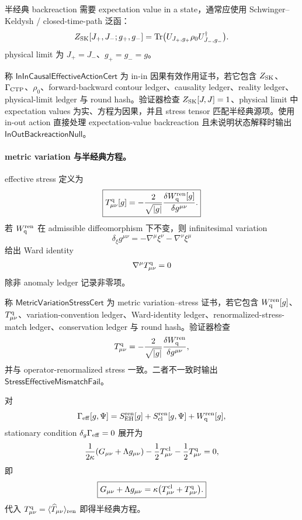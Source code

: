 半经典 backreaction 需要 expectation value in a state，通常应使用 Schwinger--Keldysh / closed-time-path 泛函：
\[
Z_{\rm SK}[J_+,J_-;g_+,g_-]
=
\operatorname{Tr}
\bigl(
U_{J_+,g_+}\rho_0U_{J_-,g_-}^{\dagger}
\bigr).
\]
physical limit 为 \(J_+=J_-\)、\(g_+=g_-=g\)。

\begin{definition}[in-in 因果有效作用证书]\label{def:typed-address-biaxial-completion-in-in-causal-effective-action-cert}
称 \(\mathsf{InInCausalEffectiveActionCert}\) 为 in-in 因果有效作用证书，若它包含 \(Z_{\rm SK}\)、\(\Gamma_{\rm CTP}\)、\(\rho_0\)、forward-backward contour ledger、causality ledger、reality ledger、physical-limit ledger 与 round hash。验证器检查 \(Z_{\rm SK}[J,J]=1\)、physical limit 中 expectation values 为实、方程为因果，并且 stress tensor 匹配半经典源项。使用 in-out action 直接处理 expectation-value backreaction 且未说明状态解释时输出 \(\mathsf{InOutBackreactionNull}\)。
\end{definition}

\paragraph{metric variation 与半经典方程。}
effective stress 定义为
\[
\boxed{
T^{\rm q}_{\mu\nu}[g]
=
-\frac{2}{\sqrt{|g|}}
\frac{\delta W_{\rm q}^{\rm ren}[g]}{\delta g^{\mu\nu}}.
}
\]
若 \(W_{\rm q}^{\rm ren}\) 在 admissible diffeomorphism 下不变，则 infinitesimal variation
\[
\delta_\xi g^{\mu\nu}
=
-\nabla^\mu\xi^\nu-\nabla^\nu\xi^\mu
\]
给出 Ward identity
\[
\nabla^\mu T^{\rm q}_{\mu\nu}=0
\]
除非 anomaly ledger 记录非零项。

\begin{definition}\label{def:typed-address-biaxial-completion-metric-variation-stress-cert}
称 \(\mathsf{MetricVariationStressCert}\) 为 metric variation--stress 证书，若它包含 \(W_{\rm q}^{\rm ren}[g]\)、\(T^{\rm q}_{\mu\nu}\)、variation-convention ledger、Ward-identity ledger、renormalized-stress-match ledger、conservation ledger 与 round hash。验证器检查
\[
T^{\rm q}_{\mu\nu}
=
-\frac{2}{\sqrt{|g|}}
\frac{\delta W_{\rm q}^{\rm ren}}{\delta g^{\mu\nu}},
\]
并与 operator-renormalized stress 一致。二者不一致时输出 \(\mathsf{StressEffectiveMismatchFail}\)。
\end{definition}

对
\[
\Gamma_{\rm eff}[g,\Psi]
=
S_{\rm EH}^{\rm ren}[g]
+
S_{\rm cl}^{\rm ren}[g,\Psi]
+
W_{\rm q}^{\rm ren}[g],
\]
stationary condition \(\delta_g\Gamma_{\rm eff}=0\) 展开为
\[
\frac{1}{2\kappa}
(G_{\mu\nu}+\Lambda g_{\mu\nu})
-
\frac12T^{\rm cl}_{\mu\nu}
-
\frac12T^{\rm q}_{\mu\nu}
=0,
\]
即
\[
\boxed{
G_{\mu\nu}+\Lambda g_{\mu\nu}
=
\kappa\bigl(T^{\rm cl}_{\mu\nu}+T^{\rm q}_{\mu\nu}\bigr).
}
\]
代入 \(T^{\rm q}_{\mu\nu}=\langle\widehat T_{\mu\nu}\rangle_{\rm ren}\) 即得半经典方程。

